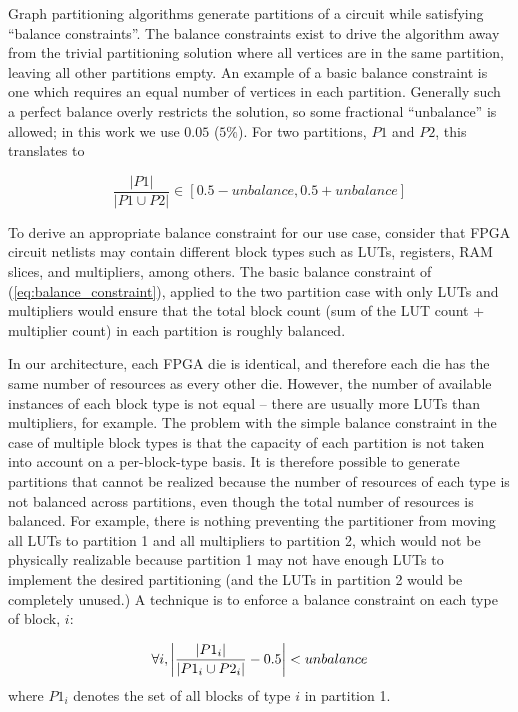 Graph partitioning algorithms generate partitions of a circuit while satisfying ``balance constraints''. The balance constraints exist to drive the algorithm away from the trivial partitioning solution where all vertices are in the same partition, leaving all other partitions empty. An example of a basic balance constraint is one which requires an equal number of vertices in each partition. Generally such a perfect balance overly restricts the solution, so some fractional ``unbalance'' is allowed; in this work we use $0.05$ ($5\%$). For two partitions, $P1$ and $P2$, this translates to~\cite{karypismanual}

\begin{equation}\label{eq:balance_constraint}
\frac{|P1|}{|P1 \cup P2|} \in [0.5 - unbalance, 0.5 + unbalance]
\end{equation}

To derive an appropriate balance constraint for our use case, consider that FPGA circuit netlists may contain different block types such as LUTs, registers, RAM slices, and multipliers, among others. The basic balance constraint of (\ref{eq:balance_constraint}), applied to the two partition case with only LUTs and multipliers would ensure that the total block count (sum of the LUT count + multiplier count) in each partition is roughly balanced.

In our architecture, each FPGA die is identical, and therefore each die has the same number of resources as every other die. However, the number of available instances of each block type is not equal -- there are usually more LUTs than multipliers, for example. The problem with the simple balance constraint in the case of multiple block types is that the capacity of each partition is not taken into account on a per-block-type basis. It is therefore possible to generate partitions that cannot be realized because the number of resources of each type is not balanced across partitions, even though the total number of resources is balanced. For example, there is nothing preventing the partitioner from moving all LUTs to partition 1 and all multipliers to partition 2, which would not be physically realizable because partition 1 may not have enough LUTs to implement the desired partitioning (and the LUTs in partition 2 would be completely unused.) A technique is to enforce a balance constraint on each type of block, $i$:

\begin{equation}
\forall i, \abs*{ \frac{| P1_i |}{|P1_i \cup P2_i |} - 0.5} < unbalance
\end{equation}
where $P1_i$ denotes the set of all blocks of type $i$ in partition 1.

